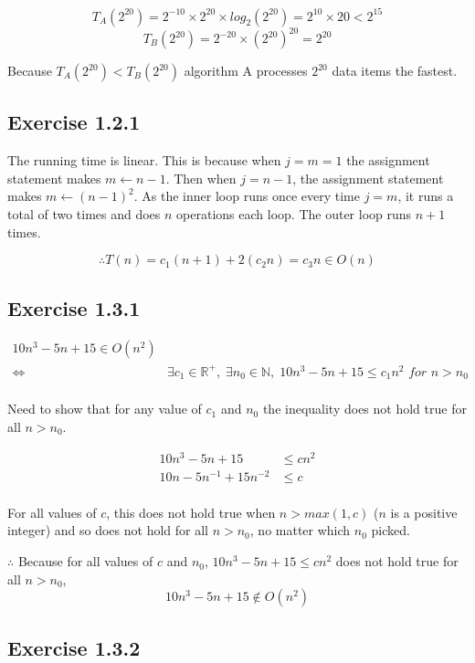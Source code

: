\documentclass{article}
\newcommand\R{\mathbb{R}}
\newcommand\iif{\Longleftrightarrow}
\begin{document}
\[T_A(2^{20})=2^{-10} \times 2^{20} \times log_2(2^{20})=2^{10} \times 20<2^{15}\]
\[T_B(2^{20})=2^{-20} \times (2^{20})^{20}=2^{20}\]

Because \(T_A(2^{20}) < T_B(2^{20})\) algorithm A processes \(2^{20}\) data items the fastest.



\subsection*{Exercise 1.2.1}

The running time is linear. This is because when \(j=m=1\) the assignment statement makes \(m \leftarrow n-1\). Then when \(j=n-1\), the assignment statement makes \(m \leftarrow (n-1)^2\). As the inner loop runs once every time \(j=m\), it runs a total of two times and does \(n\) operations each loop. The outer loop runs \(n+1\) times. 

\[\therefore T(n) = c_1(n+1) + 2(c_2n)=c_3n \in O(n)\]



\subsection*{Exercise 1.3.1}

\begin{align*}
10n^3-5n+15 \in O(n^2)& \\
\iif & \exists c_1 \in \R^+,\;\exists n_0 \in \mathbb{N},\;10n^3-5n+15 \leq c_1n^2\textit{ for }  n > n_0 \\
\end{align*}

Need to show that for any value of \(c_1\) and \(n_0\) the inequality does not hold true for all \(n > n_0\).

\begin{align*}
10n^3-5n+15 &\leq c n^2 \\
10n-5n^{-1}+15n^{-2} &\leq c  \\
\end{align*}

For all values of \(c\), this does not hold true when \(n>max(1,c)\) (\(n\) is a positive integer) and so does not hold for all \(n>n_0\), no matter which \(n_0\) picked. 

\(\therefore\) Because for all values of \(c\) and \(n_0\), \(10n^3-5n+15\leq c n^2\) does not hold true for all \(n > n_0\), \[10n^3-5n+15 \notin O(n^2)\]




\subsection*{Exercise 1.3.2}
\end{document}
